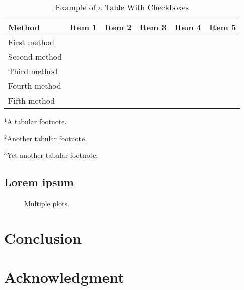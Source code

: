 \documentclass[conference]{IEEEtran}
\begin{document}
\begin{table}[!t]
\centering
\begin{threeparttable}
\renewcommand{\arraystretch}{1.25}
\setlength\tabcolsep{0.24em}
\caption{Example of a Table With Checkboxes}
\label{table_example}
\centering
\begin{tabular}{l|ccccc}
\vspace{-0.3em}
Method & Item 1 & Item 2 & Item 3 & Item 4 & Item 5 \tabularnewline
\hline
First method \cite{Hameed2018,Hameed2015} & \y[1] & \y & \y[2] & \n & \n \tabularnewline
Second method \cite{Muratore2019} & \n & \y & \y[2] & \y & \n \tabularnewline
Third method \cite{Kwon2018,Maas2003} & \y[3] & \n & \n & \y & \n \tabularnewline
Fourth method \cite{Andrews2012,Andrews2010a,Hammler2014} & \y[1] & \y & \y[2] & \y & \y \tabularnewline
Fifth method \cite{Klumperink2017} & \y & \y & \n & \y & \y \tabularnewline
\end{tabular}
\begin{tablenotes}
\scriptsize
  \item $^1$A tabular footnote.
  \item $^2$Another tabular footnote.
  \item $^3$Yet another tabular footnote.
\end{tablenotes}
\end{threeparttable}
\end{table}


\subsection{Lorem ipsum}
\lipsum[14-15]
\lipsum[16][1-8]

\begin{figure}[!t]
\centering

\caption{Multiple plots.}
\label{fig_multi}
\vspace{-0.4em}
\end{figure}


\section{Conclusion}
\label{section_concl}
\lipsum[20]


\section*{Acknowledgment}
\lipsum[50][1-2]





\end{document}

